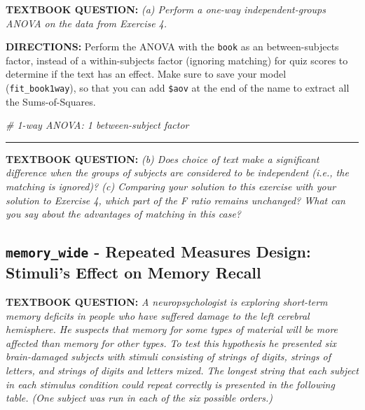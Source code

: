 \documentclass[]{article}
\newenvironment{Shaded}{\begin{snugshade}}{\end{snugshade}}
\newcommand{\CommentTok}[1]{\textcolor[rgb]{0.56,0.35,0.01}{\textit{#1}}}
\begin{document}
\textbf{TEXTBOOK QUESTION:} \emph{(a) Perform a one-way
independent-groups ANOVA on the data from Exercise 4.}

\textbf{DIRECTIONS:} Perform the ANOVA with the \texttt{book} as an
between-subjects factor, instead of a within-subjects factor (ignoring
matching) for quiz scores to determine if the text has an effect. Make
sure to save your model (\texttt{fit\_book1way}), so that you can add
\texttt{\$aov} at the end of the name to extract all the
Sums-of-Squares.

\begin{Shaded}
\begin{Highlighting}[]
\CommentTok{# 1-way ANOVA: 1 between-subject factor}
\end{Highlighting}
\end{Shaded}

\begin{center}\rule{0.5\linewidth}{\linethickness}\end{center}

\textbf{TEXTBOOK QUESTION:} \emph{(b) Does choice of text make a
significant difference when the groups of subjects are considered to be
independent (i.e., the matching is ignored)? (c) Comparing your solution
to this exercise with your solution to Exercise 4, which part of the F
ratio remains unchanged? What can you say about the advantages of
matching in this case?}

\clearpage

\subsection{\texorpdfstring{\texttt{memory\_wide} - Repeated Measures
Design: Stimuli's Effect on Memory
Recall}{memory\_wide - Repeated Measures Design: Stimuli's Effect on Memory Recall}}\label{memory_wide---repeated-measures-design-stimulis-effect-on-memory-recall}

\textbf{TEXTBOOK QUESTION:} \emph{A neuropsychologist is exploring
short-term memory deficits in people who have suffered damage to the
left cerebral hemisphere. He suspects that memory for some types of
material will be more affected than memory for other types. To test this
hypothesis he presented six brain-damaged subjects with stimuli
consisting of strings of digits, strings of letters, and strings of
digits and letters mixed. The longest string that each subject in each
stimulus condition could repeat correctly is presented in the following
table. (One subject was run in each of the six possible orders.)}
\end{document}
